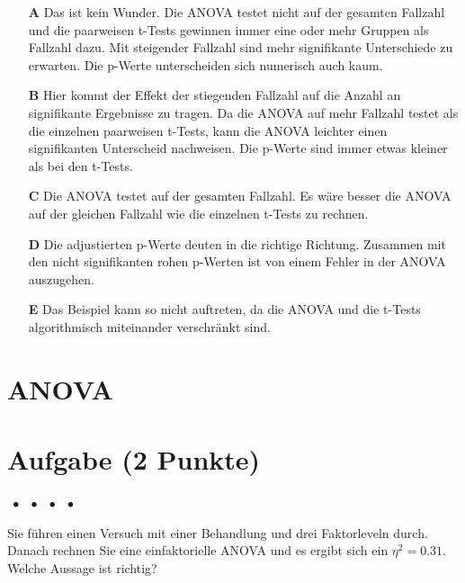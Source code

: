 \documentclass[a4paper, 9pt]{scrartcl}\usepackage[]{graphicx}\usepackage[]{xcolor}
\begin{document}
\begin{enumerate}
\item [\textbf{A} \msquare] Das ist kein Wunder. Die ANOVA testet nicht auf der gesamten Fallzahl und die paarweisen t-Tests gewinnen immer eine oder mehr Gruppen als Fallzahl dazu. Mit steigender Fallzahl sind mehr signifikante Unterschiede zu erwarten. Die p-Werte unterscheiden sich numerisch auch kaum.
\item [\textbf{B} \msquare] Hier kommt der Effekt der stiegenden Fallzahl auf die Anzahl an signifikante Ergebnisse zu tragen. Da die ANOVA auf mehr Fallzahl testet als die einzelnen paarweisen t-Tests, kann die ANOVA leichter einen signifikanten Unterscheid nachweisen. Die p-Werte sind immer etwas kleiner als bei den t-Tests.
\item [\textbf{C} \msquare] Die ANOVA testet auf der gesamten Fallzahl. Es wäre besser die ANOVA auf der gleichen Fallzahl wie die einzelnen t-Tests zu rechnen.
\item [\textbf{D} \msquare] Die adjustierten p-Werte deuten in die richtige Richtung. Zusammen mit den nicht signifikanten rohen p-Werten ist von einem Fehler in der ANOVA auszugehen.
\item [\textbf{E} \msquare] Das Beispiel kann so nicht auftreten, da die ANOVA und die t-Tests algorithmisch miteinander verschränkt sind.
\end{enumerate}
\section*{ANOVA}

\section{Aufgabe \hfill (2 Punkte)}

\ifcollection
\begin{flushright}
\tiny\vspace{-2Ex}
\textbf{\examinhaltstart}
\exammodulemathstat $\;\bullet$
\exammodulestat $\;\bullet$
\exammodulestatbbv $\;\bullet$
\exammodulestatversuch $\;\bullet$
\exammodulebiostat
\vspace{-1Ex}
\end{flushright}
\fi






Sie führen einen Versuch mit einer Behandlung und drei Faktorleveln durch. Danach rechnen Sie eine einfaktorielle ANOVA und es ergibt sich ein $\eta^2 = 0.31$. Welche Aussage ist richtig?
\end{document}
